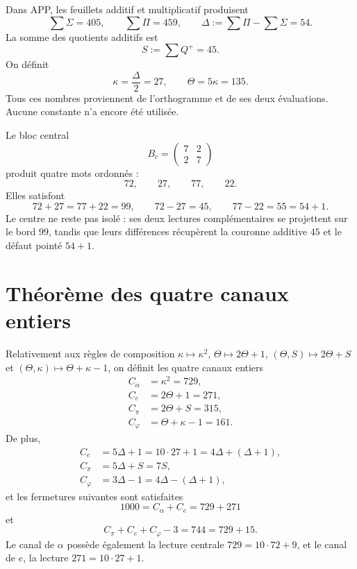 Dans APP, les feuillets additif et multiplicatif produisent
\[
 \sum\Sigma=405,
 \qquad
 \sum\Pi=459,
 \qquad
 \Delta:=\sum\Pi-\sum\Sigma=54.
\]
La somme des quotients additifs est
\[
 S:=\sum Q^+=45.
\]
On définit
\[
 \kappa=\frac{\Delta}{2}=27,
 \qquad
 \Theta=5\kappa=135.
\]
Tous ces nombres proviennent de l'orthogramme et de ses deux évaluations. Aucune
constante n'a encore été utilisée.

Le bloc central
\[
 B_c=\begin{pmatrix}7&2\\2&7\end{pmatrix}
\]
produit quatre mots ordonnés :
\[
 72,\qquad27,\qquad77,\qquad22.
\]
Elles satisfont
\[
 72+27=77+22=99,
 \qquad
 72-27=45,
 \qquad
 77-22=55=54+1.
\]
Le centre ne reste pas isolé : ses deux lectures complémentaires se
projettent sur le bord \(99\), tandis que leurs différences récupèrent la
couronne additive \(45\) et le défaut pointé \(54+1\).

\section{Théorème des quatre canaux entiers}

\begin{theorem}
\label{thm:derivacion-canales-enteros}
Relativement aux règles de composition
\(\kappa\mapsto\kappa^2\), \(\Theta\mapsto2\Theta+1\),
\((\Theta,S)\mapsto2\Theta+S\) et
\((\Theta,\kappa)\mapsto\Theta+\kappa-1\), on définit les quatre canaux
entiers
\[
\begin{aligned}
 C_\alpha&=\kappa^2=729,\\
 C_e&=2\Theta+1=271,\\
 C_\pi&=2\Theta+S=315,\\
 C_\varphi&=\Theta+\kappa-1=161.
\end{aligned}
\]
De plus,
\[
\begin{aligned}
 C_e&=5\Delta+1=10\cdot27+1
      =4\Delta+(\Delta+1),\\
 C_\pi&=5\Delta+S=7S,\\
 C_\varphi&=3\Delta-1
      =4\Delta-(\Delta+1),
\end{aligned}
\]
et les fermetures suivantes sont satisfaites
\[
 \boxed{1000=C_\alpha+C_e=729+271}
\]
et
\[
 \boxed{C_\pi+C_e+C_\varphi-3=744=729+15.}
\]
Le canal de \(\alpha\) possède également la lecture centrale
\(729=10\cdot72+9\), et le canal de \(e\), la lecture
\(271=10\cdot27+1\).
\end{theorem}

